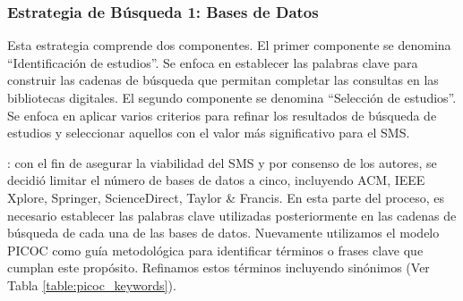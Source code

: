 
\newcommand{\acm}{518}
\newcommand{\ieee}{0}
\newcommand{\sd}{120}
\newcommand{\spr}{209}
\newcommand{\tf}{0}
\newcommand{\tot}{847}
\newcommand{\acmp}{\fpeval{round(\acm*100/\tot,2)}}
\newcommand{\ieeep}{\fpeval{round(\ieee*100/\tot,2)}}
\newcommand{\sdp}{\fpeval{round(\sd*100/\tot,2)}}
\newcommand{\sprp}{\fpeval{round(\spr*100/\tot,2)}}
\newcommand{\tfp}{\fpeval{round(\tf*100/\tot,2)}}


\newcommand{\iacm}{315}
\newcommand{\iieee}{0}
\newcommand{\isd}{101}
\newcommand{\ispr}{63}
\newcommand{\itf}{0}
\newcommand{\itot}{479}
\newcommand{\iacmp}{\fpeval{round(\iacm*100/\itot,2)}}
\newcommand{\iieeep}{\fpeval{round(\iieee*100/\itot,2)}}
\newcommand{\isdp}{\fpeval{round(\isd*100/\itot,2)}}
\newcommand{\isprp}{\fpeval{round(\ispr*100/\itot,2)}}
\newcommand{\itfp}{\fpeval{round(\itf*100/\itot,2)}}

\newcommand{\numEstEx}{3}

\newcommand{\depTot}{\fpeval{\itot-\numEstEx}}

\newcommand{\screen}{377}
\newcommand{\screenTot}{\fpeval{\depTot-\screen}}




\subsubsection{Estrategia de Búsqueda 1: Bases de Datos}

Esta estrategia comprende dos componentes. El primer componente se denomina ``Identificación de estudios''. Se enfoca en establecer las palabras clave para construir las cadenas de búsqueda que permitan completar las consultas en las bibliotecas digitales. El segundo componente se denomina ``Selección de estudios''. Se enfoca en aplicar varios criterios para refinar los resultados de búsqueda de estudios y seleccionar aquellos con el valor más significativo para el SMS.\@

: con el fin de asegurar la viabilidad del SMS y por consenso de los autores, se decidió limitar el número de bases de datos a cinco, incluyendo ACM, IEEE Xplore, Springer, ScienceDirect, Taylor \& Francis. En esta parte del proceso, es necesario establecer las palabras clave utilizadas posteriormente en las cadenas de búsqueda de cada una de las bases de datos. Nuevamente utilizamos el modelo PICOC como guía metodológica para identificar términos o frases clave que cumplan este propósito. Refinamos estos términos incluyendo sinónimos (Ver Tabla \ref{table:picoc_keywords}).

